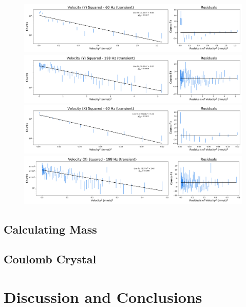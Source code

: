 \documentclass[12pt]{article}
\begin{document}
\begin{figure}[ht]
\centering
    \includegraphics[width=\textwidth]{data_02_y_vel.pdf}
	\caption{}
    \label{fig:02_y_vel}
    \includegraphics[width=\textwidth]{data_05_y_vel.pdf}
	\caption{}
    \label{fig:05_y_vel}
    \includegraphics[width=\textwidth]{data_02_x_vel.pdf}
	\caption{}
    \label{fig:02_x_vel}
    \includegraphics[width=\textwidth]{data_05_x_vel.pdf}
	\caption{}
    \label{fig:05_x_vel}
\end{figure}

\subsection{Calculating Mass}

\subsection{Coulomb Crystal}



\section{Discussion and Conclusions}



\vskip 0.2in

\end{document}
